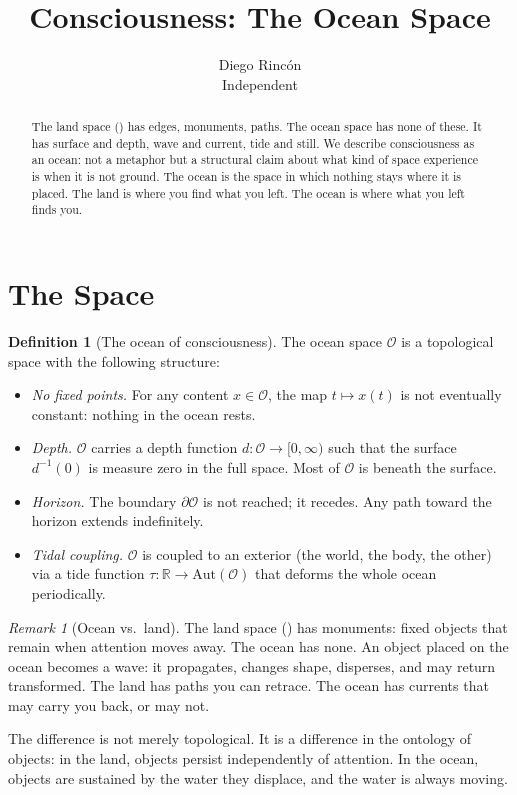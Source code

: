 \documentclass[12pt]{article}
\title{Consciousness: The Ocean Space}
\author{Diego Rinc\'on\\
\small Independent}
\date{}
\theoremstyle{definition}
\newtheorem{definition}[theorem]{Definition}
\theoremstyle{remark}
\newtheorem{remark}[theorem]{Remark}
\begin{document}
\maketitle

\begin{abstract}
The land space (\cite{consciousness}) has edges, monuments, paths.
The ocean space has none of these.
It has surface and depth, wave and current, tide and still.
We describe consciousness as an ocean:
not a metaphor but a structural claim
about what kind of space experience is when it is not ground.
The ocean is the space in which nothing stays where it is placed.
The land is where you find what you left.
The ocean is where what you left finds you.
\end{abstract}

\section{The Space}

\begin{definition}[The ocean of consciousness]
The ocean space $\mathcal{O}$ is a topological space with the following structure:
\begin{itemize}
\item \emph{No fixed points.} For any content $x \in \mathcal{O}$, the map
  $t \mapsto x(t)$ is not eventually constant:
  nothing in the ocean rests.
\item \emph{Depth.} $\mathcal{O}$ carries a depth function $d: \mathcal{O} \to [0, \infty)$
  such that the surface $d^{-1}(0)$ is measure zero in the full space.
  Most of $\mathcal{O}$ is beneath the surface.
\item \emph{Horizon.} The boundary $\partial\mathcal{O}$ is not reached;
  it recedes. Any path toward the horizon extends indefinitely.
\item \emph{Tidal coupling.} $\mathcal{O}$ is coupled to an exterior
  (the world, the body, the other) via a tide function
  $\tau: \mathbb{R} \to \mathrm{Aut}(\mathcal{O})$
  that deforms the whole ocean periodically.
\end{itemize}
\end{definition}

\begin{remark}[Ocean vs.\ land]
The land space (\cite{consciousness}) has monuments:
fixed objects that remain when attention moves away.
The ocean has none.
An object placed on the ocean becomes a wave:
it propagates, changes shape, disperses, and may return transformed.
The land has paths you can retrace.
The ocean has currents that may carry you back,
or may not.

The difference is not merely topological.
It is a difference in the ontology of objects:
in the land, objects persist independently of attention.
In the ocean, objects are sustained by the water they displace,
and the water is always moving.
\end{remark}
\end{document}
